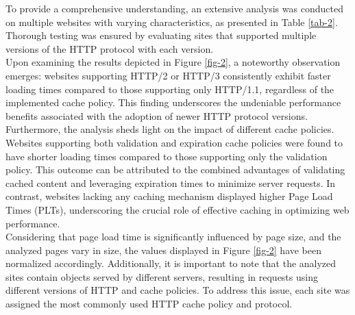 \documentclass[eng]{class}
\begin{document}
To provide a comprehensive understanding, an extensive analysis was conducted on multiple websites with varying characteristics, as presented in Table \ref{tab-2}.
Thorough testing was ensured by evaluating sites that supported multiple versions of the HTTP protocol with each version.\\
Upon examining the results depicted in Figure \ref{fig-2}, a noteworthy observation emerges: websites supporting HTTP/2 or HTTP/3
consistently exhibit faster loading times compared to those supporting only HTTP/1.1, regardless of the implemented cache policy.
This finding underscores the undeniable performance benefits associated with the adoption of newer HTTP protocol versions.\\
Furthermore, the analysis sheds light on the impact of different cache policies.
Websites supporting both validation and expiration cache policies were found to have shorter loading times compared to those supporting only the validation policy.
This outcome can be attributed to the combined advantages of validating cached content and leveraging expiration times to minimize server requests.
In contrast, websites lacking any caching mechanism displayed higher Page Load Times (PLTs),
underscoring the crucial role of effective caching in optimizing web performance.\\
Considering that page load time is significantly influenced by page size, and the analyzed pages vary in size,
the values displayed in Figure \ref{fig-2} have been normalized accordingly.
Additionally, it is important to note that the analyzed sites contain objects served by different servers,
resulting in requests using different versions of HTTP and cache policies. To address this issue,
each site was assigned the most commonly used HTTP cache policy and protocol.
\end{document}
